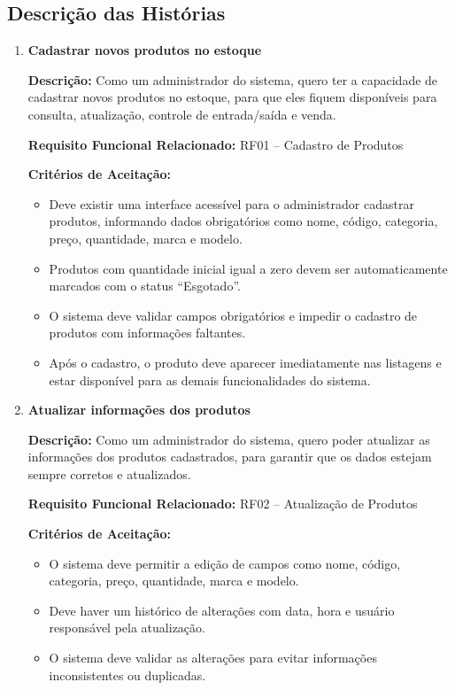 \documentclass[
	12pt,				%
	openright,			%
	twoside,			%
	a4paper,			%
	english,			%
	french,				%
	spanish,			%
	brazil				%
	]{abntex2}
\begin{document}
\FloatBarrier

\subsection{Descrição das Histórias}

\begin{enumerate}

\item \textbf{Cadastrar novos produtos no estoque}

\textbf{Descri\c{c}\~ao:} Como um administrador do sistema, quero ter a capacidade de cadastrar novos produtos no estoque, para que eles fiquem dispon\'iveis para consulta, atualiza\c{c}\~ao, controle de entrada/sa\'ida e venda.

\textbf{Requisito Funcional Relacionado:} RF01 -- Cadastro de Produtos

\textbf{Crit\'erios de Aceita\c{c}\~ao:}
\begin{itemize}
  \item Deve existir uma interface acess\'ivel para o administrador cadastrar produtos, informando dados obrigat\'orios como nome, c\'odigo, categoria, pre\c{c}o, quantidade, marca e modelo.
  \item Produtos com quantidade inicial igual a zero devem ser automaticamente marcados com o status ``Esgotado''.
  \item O sistema deve validar campos obrigat\'orios e impedir o cadastro de produtos com informa\c{c}\~oes faltantes.
  \item Ap\'os o cadastro, o produto deve aparecer imediatamente nas listagens e estar dispon\'ivel para as demais funcionalidades do sistema.
\end{itemize}

\item \textbf{Atualizar informações dos produtos}

\textbf{Descrição:} Como um administrador do sistema, quero poder atualizar as informações dos produtos cadastrados, para garantir que os dados estejam sempre corretos e atualizados.

\textbf{Requisito Funcional Relacionado:} RF02 -- Atualização de Produtos

\textbf{Critérios de Aceitação:}
\begin{itemize}
  \item O sistema deve permitir a edição de campos como nome, código, categoria, preço, quantidade, marca e modelo.
  \item Deve haver um histórico de alterações com data, hora e usuário responsável pela atualização.
  \item O sistema deve validar as alterações para evitar informações inconsistentes ou duplicadas.
\end{itemize}


\end{enumerate}
\end{document}

